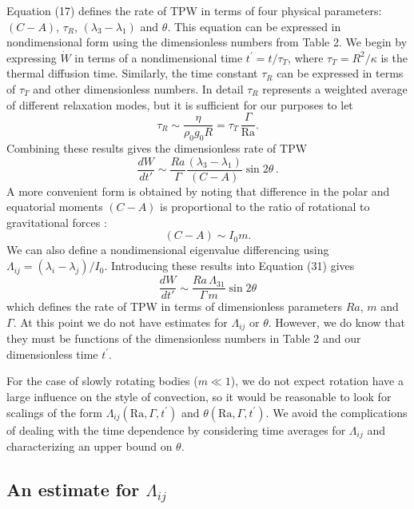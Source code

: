 \documentclass[preprint,12pt,authoryear]{elsarticle}
\begin{document}
Equation (17) defines the rate of TPW in terms of four physical parameters: $(C-A)$, $\tau_R$, $(\lambda_3-\lambda_1)$ and $\theta$. This equation can be expressed in nondimensional form using the dimensionless numbers from Table 2. We begin by expressing $\dot{W}$ in terms of a nondimensional time $t^{\prime} = t /\tau_T$, where $\tau_T = R^2/\kappa$ is the thermal diffusion time. Similarly, the time constant $\tau_R$ can be expressed in terms of $\tau_T$ and other dimensionless numbers. In detail $\tau_R$ represents a weighted average of different relaxation modes, but it is sufficient for our purposes to let
\begin{equation}
\tau_R \sim \frac{ \eta }{ \rho_0 g_0 R} = \tau_T \, \frac{\Gamma}{\mathrm{Ra} }.
\end{equation}
Combining these results gives the dimensionless rate of TPW
\begin{equation}
\frac{dW}{dt'} \sim \frac{Ra}{\Gamma} \frac{(\lambda_3 - \lambda_1)}{(C-A)} \sin 2\theta\, .
\end{equation}
A more convenient form is obtained by noting that difference in the polar and equatorial moments $(C-A)$ is proportional to the ratio of rotational to gravitational forces
\citep{munk1960rotation}:
\begin{equation}
(C-A) \sim I_0 m.
\end{equation}
We can also define a nondimensional eigenvalue differencing using $\Lambda_{ij} = (\lambda_i-\lambda_j)/I_0$. Introducing these results into Equation (31) gives
\begin{equation}
\frac{d W}{dt'} \sim \frac{Ra\, \Lambda_{31}}{\Gamma\, m} \sin 2\theta
\end{equation}
which defines the rate of TPW in terms of dimensionless parameters $Ra$, $m$ and $\Gamma$. At this point we do not have estimates for $\Lambda_{ij}$ or $\theta$.  However, we do know that they must be functions of the dimensionless numbers in Table 2 and our dimensionless time $t^{\prime}$.


For the case of slowly rotating bodies ($m \ll 1$), we do not expect rotation have a large influence on the style of convection, so it would be reasonable to  
 look for scalings of the form $\Lambda_{ij}(\mathrm{Ra}, \Gamma, t^{\prime})$ and $\theta(\mathrm{Ra}, \Gamma, t^{\prime})$. We avoid the complications of dealing with the time dependence by considering time averages for $\Lambda_{ij}$ and characterizing an upper bound on $\theta$.


\subsection{An estimate for $\Lambda_{ij}$}
\label{sec:lambda}
\end{document}
